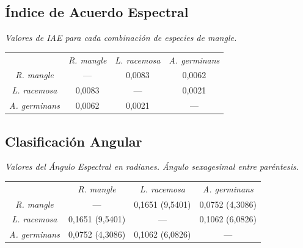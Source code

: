 \documentclass[12pt]{beamer}
\begin{document}
\subsection{Índice de Acuerdo Espectral}
\begin{frame}
	\begin{table}
		\centering
\textit{{\footnotesize Valores de IAE para cada combinación de especies de mangle.}}\\
		\begin{tabular}{@{}cccc@{}}
			\toprule[0.4mm]
			& \textit{R. mangle} & \textit{L. racemosa} & \textit{A. germinans} \\
			\textit{R. mangle} & --- & 0,0083 & 0,0062 \\
			\textit{L. racemosa} & 0,0083 & --- & 0,0021 \\
			\textit{A. germinans} & 0,0062 & 0,0021 & --- \\
			\bottomrule[0.4mm]
		\end{tabular}
	\end{table}
\end{frame}

\subsection{Clasificación Angular}
\begin{frame}
	\begin{table}
		\centering
\textit{{\footnotesize Valores del Ángulo Espectral en radianes. Ángulo sexagesimal entre paréntesis.}}
		{\small \begin{tabular}{@{}cccc@{}}
			\toprule[0.4mm]
			& \textit{R. mangle} & \textit{L. racemosa} & \textit{A. germinans} \\
			\textit{R. mangle} & --- & 0,1651 (9,5401) & 0,0752 (4,3086) \\
			\textit{L. racemosa} & 0,1651 (9,5401) & --- & 0,1062 (6,0826) \\
			\textit{A. germinans} & 0,0752 (4,3086) & 0,1062 (6,0826) & --- \\
			\bottomrule[0.4mm]
		\end{tabular}}
	\end{table}
\end{frame}
\end{document}
